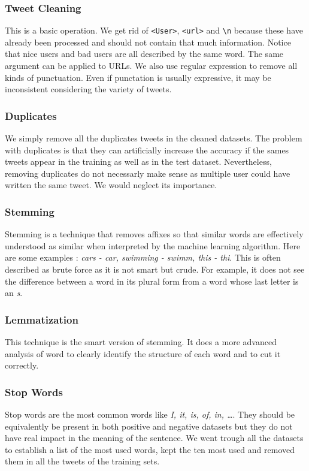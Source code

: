 \documentclass[11pt, a4paper, twocolumn]{article}
\begin{document}
\subsubsection{Tweet Cleaning}
This is a basic operation. We get rid of \texttt{<User>}, \texttt{<url>} and \verb"\n" because these have already been processed and should not contain that much information. Notice that nice users and bad users are all described by the same word. The same argument can be applied to URLs. We also use regular expression to remove all kinds of punctuation. Even if punctation is usually expressive, it may be inconsistent considering the variety of tweets.

\subsubsection{Duplicates}
We simply remove all the duplicates tweets in the cleaned datasets. The problem with duplicates is that they can artificially increase the accuracy if the sames tweets appear in the training as well as in the test dataset. Nevertheless, removing duplicates do not necessarly make sense as multiple user could have written the same tweet. We would neglect its importance.

\subsubsection{Stemming}
Stemming is a technique that removes affixes so that similar words are effectively understood as similar when interpreted by the machine learning algorithm. Here are some examples : \textit{cars - car, swimming - swimm, this - thi}. This is often described as brute force as it is not smart but crude. For example, it does not see the difference between a word in its plural form from a word whose last letter is an \textit{s}.

\subsubsection{Lemmatization}
This technique is the smart version of stemming. It does a more advanced analysis of word to clearly identify the structure of each word and to cut it correctly.

\subsubsection{Stop Words}
Stop words are the most common words like \textit{I, it, is, of, in, \dots}. They should be equivalently be present in both positive and negative datasets but they do not have real impact in the meaning of the sentence. We went trough all the datasets to establish a list of the most used words, kept the ten most used and removed them in all the tweets of the training sets.
\end{document}

